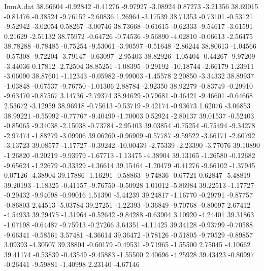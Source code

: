 \begin{filecontents}{ImuA.dat}
  38.66604   -0.92842   -0.41276   -9.97927   -3.08924    0.87273   -3.21356
  38.69015   -0.81476   -0.38524   -9.76152   -2.60836    1.26964   -3.17539
  38.71353   -0.73101   -0.53121   -9.52942   -3.02054    0.58267   -3.00746
  38.73668   -0.61615   -0.62333   -9.54617   -3.61591    0.21629   -2.51132
  38.75972   -0.64726   -0.74536   -9.56890   -4.02810   -0.06613   -2.56475
  38.78288   -0.78485   -0.75254   -9.53061   -3.90597   -0.51648   -2.86244
  38.80613   -1.04566   -0.57308   -9.72204   -3.79147   -0.63097   -2.95403
  38.82926   -1.05404   -0.44267   -9.97209   -3.44036    0.17812   -2.72504
  38.85251   -1.08395   -0.29192  -10.18744   -2.66179    1.23911   -3.06090
  38.87601   -1.12343   -0.05982   -9.99003   -1.45578    2.20850   -3.34332
  38.89937   -1.03848   -0.07537   -9.76750   -1.01306    2.88784   -2.92350
  38.92279   -0.83749   -0.29910   -9.63470   -0.87567    3.14736   -2.79374
  38.94629   -0.79681   -0.46421   -9.46601   -0.64668    2.53672   -3.12959
  38.96918   -0.75613   -0.53719   -9.42174   -0.93673    1.62076   -3.06853
  38.99221   -0.55992   -0.77767   -9.40499   -1.70003    0.52924   -2.80137
  39.01537   -0.52403   -0.85065   -9.34038   -2.15038   -0.73784   -2.95403
  39.03854   -0.75254   -0.75494   -9.34278   -2.97474   -1.88279   -3.09906
  39.06260   -0.96909   -0.57787   -9.59522   -3.66171   -2.60792   -3.13723
  39.08577   -1.17727   -0.39242  -10.00439   -2.75339   -2.23390   -3.77076
  39.10890   -1.26820   -0.20219   -9.93979   -1.67713   -1.13475   -4.38904
  39.13165   -1.26580   -0.12682   -9.65624   -1.22679   -0.33329   -4.36614
  39.15464   -1.20479   -0.41276   -9.66102   -1.37945    0.07126   -4.38904
  39.17886   -1.16291   -0.58863   -9.74836   -0.67721    0.62847   -5.48819
  39.20193   -1.18325   -0.41157   -9.76750   -0.50928    1.01012   -5.86984
  39.22513   -1.17727   -0.29432   -9.94098   -0.99016    1.51390   -5.44239
  39.24817   -1.16770   -0.29791   -9.87757   -0.86803    2.44513   -5.03784
  39.27251   -1.22393   -0.36849   -9.70768   -0.80697    2.67412   -4.54933
  39.29475   -1.31964   -0.52642   -9.84288   -0.63904    3.10920   -4.24401
  39.31863   -1.07198   -0.64487   -9.75913   -0.27266    3.64351   -4.11425
  39.34128   -0.93799   -0.70588   -9.66341   -0.58561    3.57481   -4.36614
  39.36472   -0.78126   -0.51805   -9.70529   -0.89857    3.09393   -4.30507
  39.38804   -0.60179   -0.49531   -9.71965   -1.55500    2.75045   -4.10662
  39.41174   -0.53839   -0.43549   -9.45883   -1.55500    2.40696   -4.25928
  39.43423   -0.80997   -0.26441   -9.59881   -1.40998    2.23140   -4.67146

\end{filecontents}
